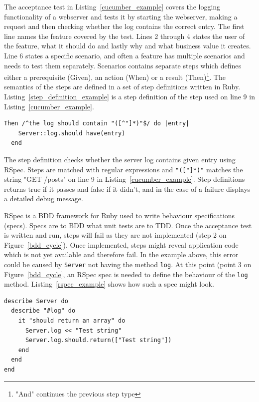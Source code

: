 The acceptance test in Listing~\ref{cucumber_example} covers the logging functionality of a webserver and tests it
by starting the webserver, making a request and then checking whether the log
contains the correct entry.  The first line names the feature covered by the
test. Lines 2 through 4 states the user of the feature, what it should do and
lastly why and what business value it creates. Line 6 states a specific
scenario, and often a feature has multiple scenarios and needs to test them
separately. Scenarios contains separate steps which defines either a
prerequisite (Given), an action (When) or a result (Then)\footnote{"And"
continues the previous step type}. The semantics of the steps are defined in a
set of step definitions written in Ruby.
Listing~\ref{step_definition_example} is a step definition of the step used on
line 9 in Listing~\ref{cucumber_example}.

\bigskip
\begin{lstlisting}[label=step_definition_example,caption=Cucumber step definition]
  Then /^the log should contain "([^"]*)"$/ do |entry|
    Server::log.should have(entry)
  end
\end{lstlisting}

The step definition checks whether the server log contains given entry using
RSpec. Steps are matched with regular expressions and \texttt{"([\^"]*)"}
matches the string "GET /posts" on line 9 in Listing~\ref{cucumber_example}.
Step definitions returns true if it passes and false if it didn't, and in the
case of a failure displays a detailed debug message.

RSpec is a BDD framework for Ruby used to write behaviour specifications
(specs). Specs are to BDD what unit tests are to TDD\@. Once the acceptance test is
written and run, steps will fail as they are not implemented (step 2 on
Figure~\ref{bdd_cycle}). Once implemented, steps might reveal application code
which is not yet available and therefore fail. In the example above, this error
could be caused by \texttt{Server} not having the method \texttt{log}. At this
point (point 3 on Figure~\ref{bdd_cycle}, an RSpec spec is needed to define the
behaviour of the \texttt{log} method. Listing~\ref{rspec_example} shows how such
a spec might look.

\bigskip
\begin{lstlisting}[label=rspec_example,caption=RSpec (spec) example]
describe Server do
  describe "#log" do
    it "should return an array" do
      Server.log << "Test string"
      Server.log.should.return(["Test string"])
    end
  end
end
\end{lstlisting}

